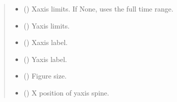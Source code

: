 \documentclass[letterpaper,10pt,english]{sphinxhowto}
\begin{document}
\begin{fulllineitems}
\begin{quote}
\begin{description}
\begin{itemize}
\item {} 
\sphinxAtStartPar
{} (\sphinxstyleliteralemphasis{\sphinxupquote{, }}) \textendash{} X\sphinxhyphen{}axis limits. If None, uses the full time range.

\item {} 
\sphinxAtStartPar
{} (\sphinxstyleliteralemphasis{\sphinxupquote{, }}\sphinxstyleliteralemphasis{\sphinxupquote{(}}\sphinxstyleliteralemphasis{\sphinxupquote{, }}\sphinxstyleliteralemphasis{\sphinxupquote{)}}) \textendash{} Y\sphinxhyphen{}axis limits.

\item {} 
\sphinxAtStartPar
{} (\sphinxstyleliteralemphasis{\sphinxupquote{, }}\sphinxstyleliteralemphasis{\sphinxupquote{ (}}\sphinxstyleliteralemphasis{\sphinxupquote{)}}) \textendash{} X\sphinxhyphen{}axis label.

\item {} 
\sphinxAtStartPar
{} (\sphinxstyleliteralemphasis{\sphinxupquote{, }}) \textendash{} Y\sphinxhyphen{}axis label.

\item {} 
\sphinxAtStartPar
{} (\sphinxstyleliteralemphasis{\sphinxupquote{, }}\sphinxstyleliteralemphasis{\sphinxupquote{(}}\sphinxstyleliteralemphasis{\sphinxupquote{, }}\sphinxstyleliteralemphasis{\sphinxupquote{)}}) \textendash{} Figure size.

\item {} 
\sphinxAtStartPar
{} (\sphinxstyleliteralemphasis{\sphinxupquote{, }}) \textendash{} X position of y\sphinxhyphen{}axis spine.


\end{itemize}
\end{description}
\end{quote}
\end{fulllineitems}
\end{document}
